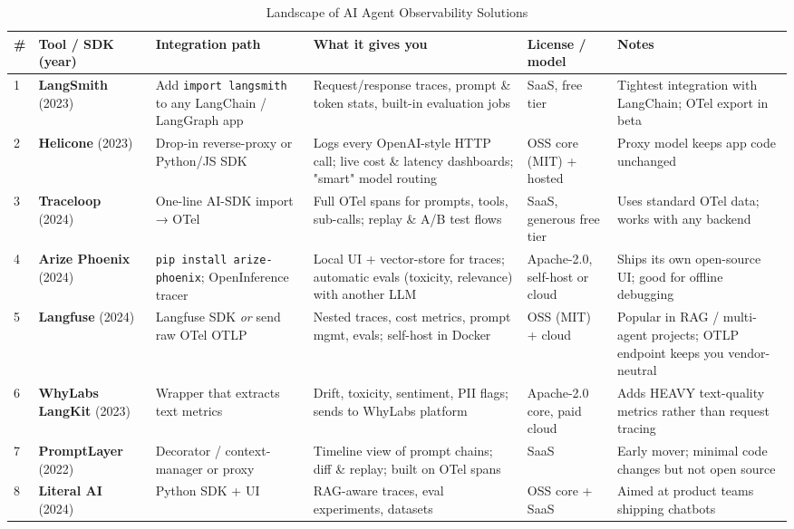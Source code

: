 \documentclass[sigplan,screen，review,9pt]{acmart}
\begin{document}
\begin{table*}[t]
\caption{Landscape of AI Agent Observability Solutions}
\label{tab:landscape}
\centering
\scriptsize
\begin{tabular}{p{0.3cm} p{2.2cm} p{2.5cm} p{2.8cm} p{1.5cm} p{2.2cm}}
\toprule
\# & Tool / SDK (year) & Integration path & What it gives you & License / model & Notes \\
\midrule
1 & \textbf{LangSmith} (2023)~\cite{langsmith} & Add \texttt{import langsmith} to any LangChain / LangGraph app & Request/response traces, prompt \& token stats, built-in evaluation jobs & SaaS, free tier & Tightest integration with LangChain; OTel export in beta \\
2 & \textbf{Helicone} (2023)~\cite{helicone} & Drop-in reverse-proxy or Python/JS SDK & Logs every OpenAI-style HTTP call; live cost \& latency dashboards; "smart" model routing & OSS core (MIT) + hosted & Proxy model keeps app code unchanged \\
3 & \textbf{Traceloop} (2024)~\cite{traceloop} & One-line AI-SDK import → OTel & Full OTel spans for prompts, tools, sub-calls; replay \& A/B test flows & SaaS, generous free tier & Uses standard OTel data; works with any backend \\
4 & \textbf{Arize Phoenix} (2024)~\cite{phoenix} & \texttt{pip install arize-phoenix}; OpenInference tracer & Local UI + vector-store for traces; automatic evals (toxicity, relevance) with another LLM & Apache-2.0, self-host or cloud & Ships its own open-source UI; good for offline debugging \\
5 & \textbf{Langfuse} (2024)~\cite{langfuse} & Langfuse SDK \emph{or} send raw OTel OTLP & Nested traces, cost metrics, prompt mgmt, evals; self-host in Docker & OSS (MIT) + cloud & Popular in RAG / multi-agent projects; OTLP endpoint keeps you vendor-neutral \\
6 & \textbf{WhyLabs LangKit} (2023)~\cite{whylabs} & Wrapper that extracts text metrics & Drift, toxicity, sentiment, PII flags; sends to WhyLabs platform & Apache-2.0 core, paid cloud & Adds HEAVY text-quality metrics rather than request tracing \\
7 & \textbf{PromptLayer} (2022)~\cite{promptlayer} & Decorator / context-manager or proxy & Timeline view of prompt chains; diff \& replay; built on OTel spans & SaaS & Early mover; minimal code changes but not open source \\
8 & \textbf{Literal AI} (2024)~\cite{literalai} & Python SDK + UI & RAG-aware traces, eval experiments, datasets & OSS core + SaaS & Aimed at product teams shipping chatbots \\

\end{tabular}
\end{table*}
\end{document}
